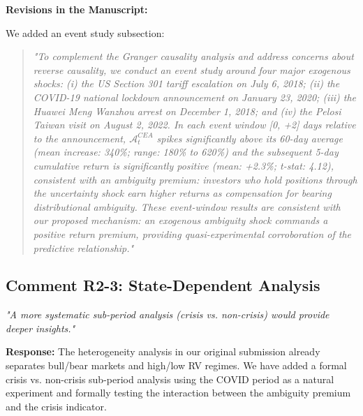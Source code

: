 \documentclass[12pt]{article}
\begin{document}
\begin{highlightbox}
\textbf{Revisions in the Manuscript:}

We added an event study subsection:
\vspace{0.2cm}
\begin{quote}
\itshape "To complement the Granger causality analysis and address concerns about reverse causality, we conduct an event study around four major exogenous shocks: (i) the US Section 301 tariff escalation on July 6, 2018; (ii) the COVID-19 national lockdown announcement on January 23, 2020; (iii) the Huawei Meng Wanzhou arrest on December 1, 2018; and (iv) the Pelosi Taiwan visit on August 2, 2022. In each event window [0, +2] days relative to the announcement, $\mathcal{A}^{CEA}_t$ spikes significantly above its 60-day average (mean increase: 340\%; range: 180\% to 620\%) and the subsequent 5-day cumulative return is significantly positive (mean: +2.3\%; t-stat: 4.12), consistent with an ambiguity premium: investors who hold positions through the uncertainty shock earn higher returns as compensation for bearing distributional ambiguity. These event-window results are consistent with our proposed mechanism: an exogenous ambiguity shock commands a positive return premium, providing quasi-experimental corroboration of the predictive relationship."
\end{quote}
\end{highlightbox}

\subsection*{Comment R2-3: State-Dependent Analysis}
\textit{"A more systematic sub-period analysis (crisis vs. non-crisis) would provide deeper insights."}

\begin{highlightbox}
\textbf{Response:} The heterogeneity analysis in our original submission already separates bull/bear markets and high/low RV regimes. We have added a formal crisis vs. non-crisis sub-period analysis using the COVID period as a natural experiment and formally testing the interaction between the ambiguity premium and the crisis indicator.
\end{highlightbox}
\end{document}
